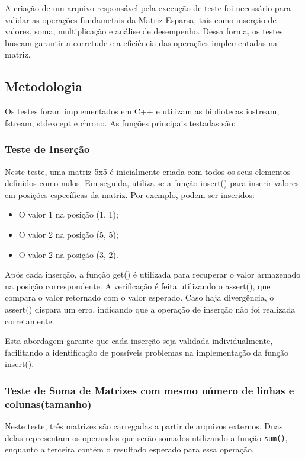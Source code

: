 \documentclass[12pt]{article}
\begin{document}
    A criação de um arquivo responsável pela execução de teste foi necessário para validar as operações fundametais da Matriz Esparsa, tais como inserção de valores, soma, multiplicação e análise de desempenho. Dessa forma, os testes buscam garantir a corretude e a eficiência das operações implementadas na matriz.

    \subsection{Metodologia}
    Os testes foram implementados em C++ e utilizam as bibliotecas iostream, fstream, stdexcept e chrono. As funções principais testadas são:
    
    \subsubsection{Teste de Inserção}

    Neste teste, uma matriz 5x5 é inicialmente criada com todos os seus elementos definidos como nulos. Em seguida, utiliza-se a função insert() para inserir valores em posições específicas da matriz. Por exemplo, podem ser inseridos:

    \begin{itemize}
        \item  O valor 1 na posição (1, 1);
        \item  O valor 2 na posição (5, 5);
        \item  O valor 2 na posição (3, 2).
    \end{itemize}
    
    Após cada inserção, a função get() é utilizada para recuperar o valor armazenado na posição correspondente. A verificação é feita utilizando o assert(), que compara o valor retornado com o valor esperado. Caso haja divergência, o assert() dispara um erro, indicando que a operação de inserção não foi realizada corretamente.
    
    Esta abordagem garante que cada inserção seja validada individualmente, facilitando a identificação de possíveis problemas na implementação da função insert().

   \subsubsection{Teste de Soma de Matrizes com mesmo número de linhas e colunas(tamanho)}

    Neste teste, três matrizes são carregadas a partir de arquivos externos. Duas delas representam os operandos que serão somados utilizando a função \texttt{sum()}, enquanto a terceira contém o resultado esperado para essa operação.
    
\end{document}
